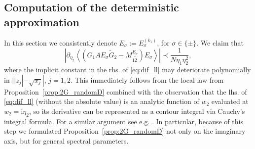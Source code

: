 \documentclass[10pt]{amsart}
\numberwithin{equation}{section}
\newcommand{\ii}{\mathrm{i}}
\begin{document}
\subsection{Computation of the deterministic approximation}\label{sec:Cov_determ} In this section we consistently denote $E_\sigma:=E^{(k_1)}_\sigma$, for $\sigma\in\{\pm\}$. We claim that 
\begin{equation}
\left\vert\partial_{\eta_2} \left\langle \left(G_1AE_\sigma \widetilde{G}_2 -M_{1\widetilde{2}}^{E_\sigma}\right)E_\sigma\right\rangle\right\vert \prec\frac{1}{N\eta_1\eta_2^2},
\label{eq:dif_ll}
\end{equation}
where the implicit constant in the rhs. of \eqref{eq:dif_ll} may deteriorate polynomially in $||z_j|-\sqrt{x_j}|$, $j=1,2$. This immediately follows from the local law from Proposition~\ref{prop:2G_randomD} combined with the observation that the lhs. of \eqref{eq:dif_ll} (without the absolute value) is an analytic function of $w_2$ evaluated at $w_2=\ii\eta_2$, so its derivative can be represented as a contour integral via Cauchy's integral formula. For a similar argument see e.g. \cite[Eq.(7.11)]{hyperuniformity}. In particular, because of this step we formulated Proposition~\ref{prop:2G_randomD} not only on the imaginary axis, but for general spectral parameters.  
\end{document}
